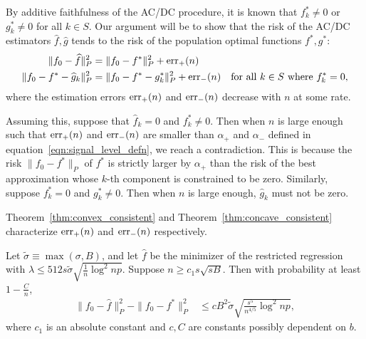 By additive faithfulness of the AC/DC procedure, it is known that $f^*_k \neq 0$ or $g^*_k \neq 0$ for all $k \in S$. 
Our argument will be to show that the risk of the AC/DC estimators $\hat{f}, \hat{g}$ tends to the risk of the population optimal functions $f^*, g^*$:
\begin{align*}
\| f_0 - \widehat{f} \|^2_P & = \| f_0 - f^* \|^2_P + \textrm{err}_+(n) \\
\| f_0 - f^* - \widehat{g}_k \|^2_P &=  \| f_0 - f^* - g^*_k \|^2_P + \textrm{err}_-(n) 
       \quad \textrm{for all $k \in S$ where $f^*_k = 0$},
\end{align*}
where the estimation errors $\textrm{err}_+(n)$ and $\textrm{err}_-(n)$ decrease with $n$ at some rate. 

Assuming this, suppose that $\hat{f}_k = 0$ and $f^*_k \neq 0$. Then when $n$ is large
enough such that $\textrm{err}_+(n)$ and $\textrm{err}_-(n)$ are smaller
than $\alpha_+$ and $\alpha_-$ defined in
equation~\eqref{eqn:signal_level_defn}, we reach a contradiction.
This is because the risk $\| f_0 - f^* \|_P$ of $f^*$ is
strictly larger by $\alpha_+$ than the risk of the best approximation
whose $k$-th component is constrained to be zero.
Similarly, suppose $f^*_k = 0$ and $g^*_k \neq 0$. Then when $n$ is large
enough, $\hat{g}_k$ must not be zero.

Theorem~\ref{thm:convex_consistent} and
Theorem~\ref{thm:concave_consistent} characterize $\textrm{err}_+(n)$ and
$\textrm{err}_-(n)$ respectively.

\begin{theorem}
\label{thm:convex_consistent}
Let $\tilde{\sigma} \equiv \max(\sigma, B)$, and let $\hat{f}$ be the
minimizer of the restricted regression with $\lambda \leq 512 s
\tilde{\sigma} \sqrt{ \frac{1}{n} \log^2 np}$.
Suppose $n \geq c_1 s \sqrt{sB}$.
Then with probability at least $1-\frac{C}{n}$,
\begin{align}
\|f_0 - \hat{f} \|_P^2 - \| f_0 - f^* \|_P^2 
&\leq c B^2 \tilde{\sigma} \sqrt{ \frac{s^5}{n^{4/5}} \log^2 np},
\end{align}
where $c_1$ is an absolute constant and $c, C$ are constants possibly dependent on $b$.
\end{theorem}


